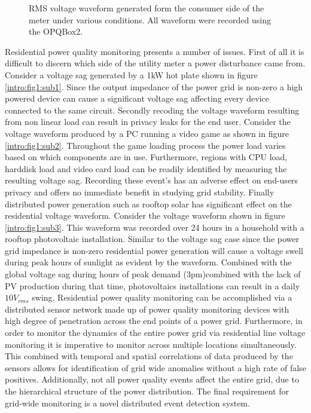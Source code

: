 \begin{figure}[h]
	\caption{RMS voltage waveform generated form the consumer side of the meter under various conditions. All waveform were recorded using the OPQBox2.}
	\label{intro:fig:1}
\end{figure}

Residential power quality monitoring presents a number of issues. First of all it is difficult to discern which side of the utility meter a power disturbance came from. Consider a voltage sag generated by a 1kW hot plate shown in figure \ref{intro:fig1:sub1}.  Since the output impedance of the power grid is non-zero a high powered device can cause a significant voltage sag affecting every device connected to the same circuit. Secondly recoding the voltage waveform resulting from non linear load can result in privacy leaks for the end user. Consider the voltage waveform produced by a PC running a video game as shown in figure \ref{intro:fig1:sub2}. Throughout the game loading process the power load varies based on which components are in use. Furthermore, regions with CPU load, harddisk load and video card load can be readily identified by measuring the resulting voltage sag. Recording these event's has an adverse effect on end-users privacy and offers no immediate benefit in studying grid stability. Finally distributed power generation such as rooftop solar has significant effect on the residential voltage waveform. Consider the voltage waveform shown in figure \ref{intro:fig1:sub3}. This waveform was recorded over 24 hours in a household with a rooftop photovoltaic installation. Similar to the voltage sag case since the power grid impedance is non-zero residential power generation will cause a voltage swell during peak hours of sunlight as evident by the waveform. Combined with the global voltage sag during hours of peak demand (3pm)combined with the lack of PV production during that time, photovoltaics installations can result in a daily $10V_{rms}$ swing. Residential power quality monitoring can be accomplished via a distributed sensor network made up of power quality monitoring devices with high degree of penetration across the end points of a power grid. Furthermore, in order to monitor the dynamics of the entire power grid via residential line voltage monitoring it is imperative to monitor across multiple locations simultaneously. This combined with temporal and spatial correlations of data produced by the sensors allows for identification of grid wide anomalies without a high rate of false positives. Additionally, not all power quality events affect the entire grid, due to the hierarchical structure of the power distribution. The final requirement for grid-wide monitoring is a novel distributed event detection system.

